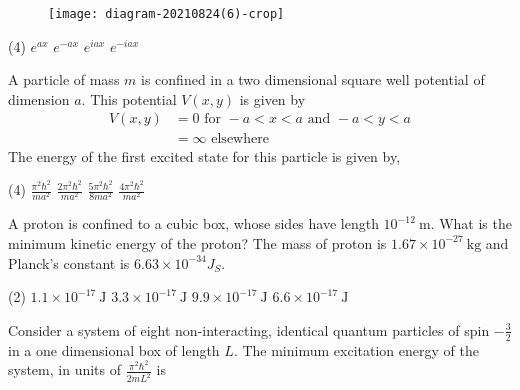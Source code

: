 \begin{enumerate}
\begin{minipage}{\textwidth}
	\begin{figure}[H]
		\centering
		\texttt{[image: diagram-20210824(6)-crop]}
	\end{figure}
\end{minipage}
\begin{tasks}(4)
	\task[\textbf{A.}] $e^{a x}$
	\task[\textbf{B.}] $e^{-a x}$
	\task[\textbf{C.}] $e^{i a x}$
	\task[\textbf{D.}]$e^{-i a x}$
\end{tasks}
\begin{minipage}{\textwidth}
	\item A particle of mass $m$ is confined in a two dimensional square well potential of dimension $a$. This potential $V(x, y)$ is given by
	$$
	\begin{aligned}
	V(x, y) &=0 \text { for }-a<x<a \text { and }-a<y<a \\
	&=\infty \text { elsewhere }
	\end{aligned}
	$$
	The energy of the first excited state for this particle is given by,
\end{minipage}
\begin{tasks}(4)
	\task[\textbf{A.}]$\frac{\pi^{2} \hbar^{2}}{m a^{2}}$
	\task[\textbf{B.}] $\frac{2 \pi^{2} \hbar^{2}}{m a^{2}}$
	\task[\textbf{C.}]$\frac{5 \pi^{2} \hbar^{2}}{8 m a^{2}}$
	\task[\textbf{D.}] $\frac{4 \pi^{2} \hbar^{2}}{m a^{2}}$
\end{tasks}
\begin{minipage}{\textwidth}
	\item A proton is confined to a cubic box, whose sides have length $10^{-12} \mathrm{~m}$. What is the minimum kinetic energy of the proton? The mass of proton is $1.67 \times 10^{-27} \mathrm{~kg}$ and Planck's constant is $6.63 \times 10^{-34} J_{S}$.
\end{minipage}
\begin{tasks}(2)
	\task[\textbf{A.}] $1.1 \times 10^{-17} \mathrm{~J}$
	\task[\textbf{B.}] $3.3 \times 10^{-17} \mathrm{~J}$
	\task[\textbf{C.}]$9.9 \times 10^{-17} \mathrm{~J}$
	\task[\textbf{D.}]$6.6 \times 10^{-17} \mathrm{~J}$
\end{tasks}
\begin{minipage}{\textwidth}
	\item Consider a system of eight non-interacting, identical quantum particles of spin $-\frac{3}{2}$ in a one dimensional box of length $L$. The minimum excitation energy of the system, in units of $\frac{\pi^{2} \hbar^{2}}{2 m L^{2}}$ is

\end{minipage}
\end{enumerate}
